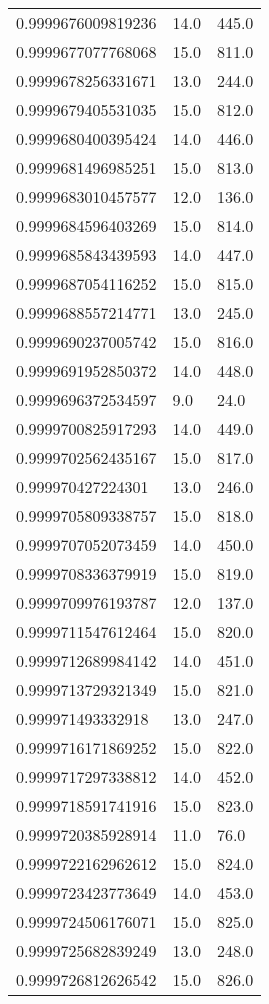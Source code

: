 \begin{center}
\begin{supertabular}[H]{p{0.30\textwidth}p{0.05\textwidth}p{0.05\textwidth}}
0.9999676009819236 & 14.0 & 445.0 \\ 
0.9999677077768068 & 15.0 & 811.0 \\ 
0.9999678256331671 & 13.0 & 244.0 \\ 
0.9999679405531035 & 15.0 & 812.0 \\ 
0.9999680400395424 & 14.0 & 446.0 \\ 
0.9999681496985251 & 15.0 & 813.0 \\ 
0.9999683010457577 & 12.0 & 136.0 \\ 
0.9999684596403269 & 15.0 & 814.0 \\ 
0.9999685843439593 & 14.0 & 447.0 \\ 
0.9999687054116252 & 15.0 & 815.0 \\ 
0.9999688557214771 & 13.0 & 245.0 \\ 
0.9999690237005742 & 15.0 & 816.0 \\ 
0.9999691952850372 & 14.0 & 448.0 \\ 
0.9999696372534597 & 9.0 & 24.0 \\ 
0.9999700825917293 & 14.0 & 449.0 \\ 
0.9999702562435167 & 15.0 & 817.0 \\ 
0.999970427224301 & 13.0 & 246.0 \\ 
0.9999705809338757 & 15.0 & 818.0 \\ 
0.9999707052073459 & 14.0 & 450.0 \\ 
0.9999708336379919 & 15.0 & 819.0 \\ 
0.9999709976193787 & 12.0 & 137.0 \\ 
0.9999711547612464 & 15.0 & 820.0 \\ 
0.9999712689984142 & 14.0 & 451.0 \\ 
0.9999713729321349 & 15.0 & 821.0 \\ 
0.999971493332918 & 13.0 & 247.0 \\ 
0.9999716171869252 & 15.0 & 822.0 \\ 
0.9999717297338812 & 14.0 & 452.0 \\ 
0.9999718591741916 & 15.0 & 823.0 \\ 
0.9999720385928914 & 11.0 & 76.0 \\ 
0.9999722162962612 & 15.0 & 824.0 \\ 
0.9999723423773649 & 14.0 & 453.0 \\ 
0.9999724506176071 & 15.0 & 825.0 \\ 
0.9999725682839249 & 13.0 & 248.0 \\ 
0.9999726812626542 & 15.0 & 826.0 \\ 

\end{supertabular}
\end{center}

